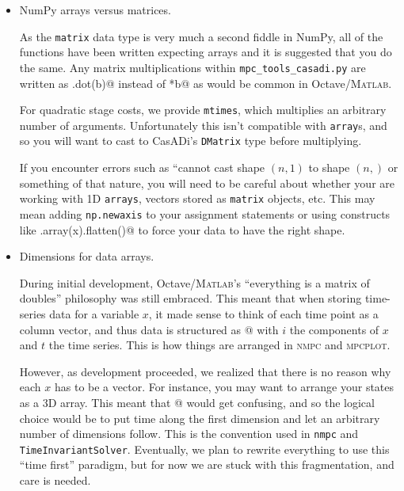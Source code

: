 \documentclass{article}
\newcommand{\casadi}{CasADi}
\begin{document}
\begin{itemize}
    \item NumPy arrays versus matrices.
    
    As the \texttt{matrix} data type is very much a second fiddle in NumPy, all of the functions have been written expecting arrays and it is suggested that you do the same.
    Any matrix multiplications within \texttt{mpc\_tools\_casadi.py} are written as \lstinline@A.dot(b)@ instead of \lstinline@A*b@ as would be common in Octave/\textsc{Matlab}.
    
    For quadratic stage costs, we provide \texttt{mtimes}, which multiplies an arbitrary number of arguments.
    Unfortunately this isn't compatible with \texttt{array}s, and so you will want to cast to \casadi{}'s \texttt{DMatrix} type before multiplying.
    
    If you encounter errors such as ``cannot cast shape $(n,1)$ to shape $(n,)$ or something of that nature, you will need to be careful about whether your are working with 1D \texttt{arrays}, vectors stored as \texttt{matrix} objects, etc.
    This may mean adding \texttt{np.newaxis} to your assignment statements or using constructs like \lstinline@np.array(x).flatten()@ to force your data to have the right shape.
    
    \item Dimensions for data arrays.
    
    During initial development, Octave/\textsc{Matlab}'s ``everything is a matrix of doubles'' philosophy was still embraced.
    This meant that when storing time-series data for a variable $x$, it made sense to think of each time point as a column vector, and thus data is structured as \lstinline@x[i,t]@ with $i$ the components of $x$ and $t$ the time series.
    This is how things are arranged in \textsc{nmpc} and \textsc{mpcplot}.
    
    However, as development proceeded, we realized that there is no reason why each $x$ has to be a vector.
    For instance, you may want to arrange your states as a 3D array.
    This meant that \lstinline@x[i_1,t,i_2,i_3]@ would get confusing, and so the logical choice would be to put time along the first dimension and let an arbitrary number of dimensions follow.
    This is the convention used in \texttt{nmpc} and \texttt{TimeInvariantSolver}.
    Eventually, we plan to rewrite everything to use this ``time first'' paradigm, but for now we are stuck with this fragmentation, and care is needed. 
    

\end{itemize}
\end{document}
